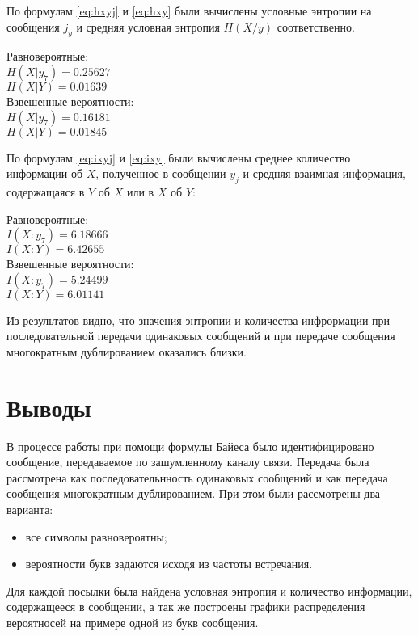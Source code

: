 По формулам \ref{eq:hxyj} и \ref{eq:hxy} были вычислены условные энтропии на сообщения $j_y$ и средняя условная энтропия $H(X/y)$ соответственно. 

\begin{multicols}{2}
\begin{center}
Равновероятные:\\
$H(X|y_7) = 0.25627$\\
$H(X|Y) = 0.01639$\\
Взвешенные вероятности:\\
$H(X|y_7) = 0.16181$\\
$H(X|Y) = 0.01845$
\end{center}
\end{multicols}

По формулам \ref{eq:ixyj} и \ref{eq:ixy} были вычислены среднее количество информации об $X$, полученное в сообщении $y_j$ и средняя взаимная информация, содержащаяся в $Y$ об $X$ или в $X$ об $Y$: 

\begin{multicols}{2}
\begin{center}
Равновероятные:\\
$I(X:y_7) = 6.18666$\\
$I(X:Y) = 6.42655$\\
Взвешенные вероятности:\\
$I(X:y_7) = 5.24499$\\
$I(X:Y) = 6.01141$
\end{center}
\end{multicols}

Из результатов видно, что значения энтропии и количества инфрормации при последовательной передачи одинаковых сообщений и при передаче сообщения многократным дублированием оказались близки.

\section{Выводы}

В процессе работы при помощи формулы Байеса было идентифицировано сообщение, передаваемое по зашумленному каналу связи. Передача была рассмотрена как последовательнность одинаковых сообщений и как передача сообщения многократным дублированием. При этом были рассмотрены два варианта: 
\begin{itemize}
\item все символы равновероятны;
\item вероятности букв задаются исходя из частоты встречания.
\end{itemize}
Для каждой посылки была найдена условная энтропия и количество информации, содержащееся в сообщении, а так же построены графики распределения вероятносей на примере одной из букв сообщения.

